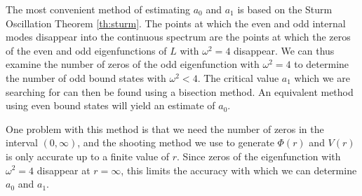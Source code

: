 



The most convenient method of estimating $a_0$ and $a_1$ is based on the Sturm Oscillation Theorem \ref{th:sturm}. The points at which the even and odd internal modes disappear into the continuous spectrum are the points at which the zeros of the even and odd eigenfunctions of $L$ with $\omega^2=4$ disappear. We can thus examine the number of zeros of the odd eigenfunction with $\omega^2=4$ to determine the number of odd bound states with $\omega^2<4$. The critical value $a_1$ which we are searching for can then be found using a bisection method. An equivalent method using even bound states will yield an estimate of $a_0$.

One problem with this method is that we need the number of zeros in the interval $(0,\infty)$, and the shooting method we use to generate $\Phi(r)$ and $V(r)$ is only accurate up to a finite value of $r$. Since zeros of the eigenfunction with $\omega^2=4$ disappear at $r=\infty$, this limits the accuracy with which we can determine $a_0$ and $a_1$.

